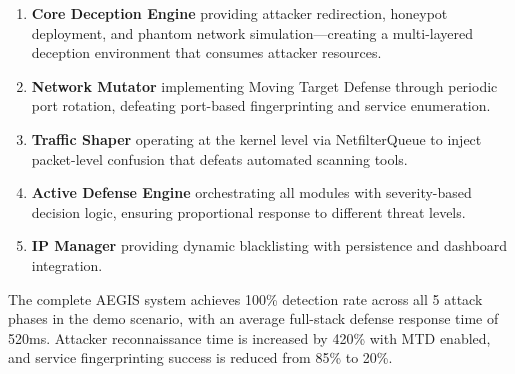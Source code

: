 \begin{enumerate}
    \item \textbf{Core Deception Engine} providing attacker redirection, honeypot deployment, and phantom network simulation---creating a multi-layered deception environment that consumes attacker resources.
    \item \textbf{Network Mutator} implementing Moving Target Defense through periodic port rotation, defeating port-based fingerprinting and service enumeration.
    \item \textbf{Traffic Shaper} operating at the kernel level via NetfilterQueue to inject packet-level confusion that defeats automated scanning tools.
    \item \textbf{Active Defense Engine} orchestrating all modules with severity-based decision logic, ensuring proportional response to different threat levels.
    \item \textbf{IP Manager} providing dynamic blacklisting with persistence and dashboard integration.
\end{enumerate}

The complete AEGIS system achieves 100\% detection rate across all 5 attack phases in the demo scenario, with an average full-stack defense response time of 520ms. Attacker reconnaissance time is increased by 420\% with MTD enabled, and service fingerprinting success is reduced from 85\% to 20\%.
